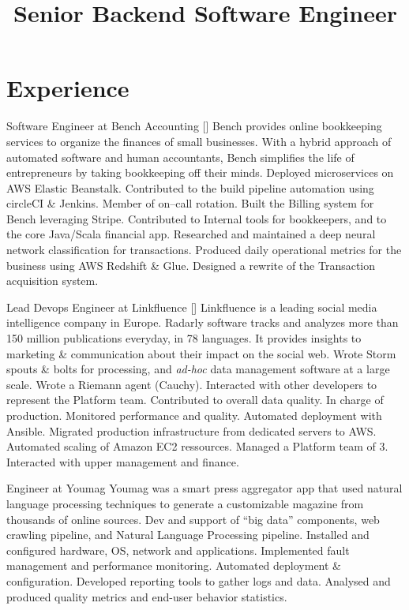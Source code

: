 \documentclass[12pt,a4paper]{moderncv}
\title{Senior Backend Software Engineer}             %
\begin{document}
\maketitle

\section{Experience}

        {Software Engineer at Bench Accounting}
        {}{}{[]}
{Bench provides online bookkeeping services to organize the finances of small businesses.
  With a hybrid approach of automated software and human accountants, Bench simplifies
  the life of entrepreneurs by taking bookkeeping off their minds.}
{Deployed microservices on AWS Elastic Beanstalk. Contributed to the build pipeline
  automation using circleCI \& Jenkins. Member of on--call rotation.}
{Built the Billing system for Bench leveraging Stripe. Contributed to Internal tools for
  bookkeepers, and to the core Java/Scala financial app.}
{Researched and maintained a deep neural network classification for transactions.
  Produced daily operational metrics for the business using AWS Redshift \& Glue.
  Designed a rewrite of the Transaction acquisition system.}

        {Lead Devops Engineer at Linkfluence}
        {}{}{[]}
{Linkfluence is a leading social media intelligence company in Europe. Radarly
  software tracks and analyzes more than 150 million publications everyday, in 78 languages.
  It provides insights to marketing \& communication about their impact on the social web.}
{Wrote Storm spouts \& bolts for processing, and {\em ad-hoc} data management software
  at a large scale. Wrote a Riemann agent (Cauchy). Interacted with other
  developers to represent the Platform team. Contributed to overall data quality.}
{In charge of production. Monitored performance and quality.
  Automated deployment with Ansible. Migrated production infrastructure from dedicated
  servers to AWS. Automated scaling of Amazon EC2 ressources.}
{Managed a Platform team of 3. Interacted with upper management and finance.}

        {Engineer at Youmag}
        {}{}{}
{Youmag was a smart press aggregator app that used
  natural language processing techniques to generate
  a customizable magazine from thousands of online sources.}
{Dev and support of ``big data'' components, web crawling pipeline,
 and Natural Language Processing pipeline.}
{Installed and configured hardware, OS, network and applications.
 Implemented fault management and performance monitoring.
 Automated deployment \& configuration.}
{Developed reporting tools to gather logs and data. Analysed and produced
 quality metrics and end-user behavior statistics.}
\end{document}
